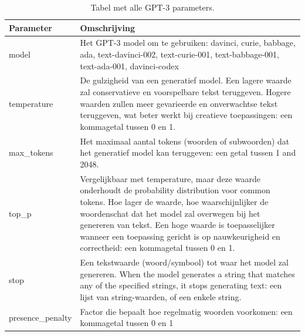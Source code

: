 \begin{center}
	\begin{table}[H]
	\begin{tabular}{ m{2cm} | m{13cm} | }
		\hline
		Parameter & Omschrijving \\
		\hline
		model & Het GPT-3 model om te gebruiken: davinci, curie, babbage, ada, text-davinci-002, text-curie-001, text-babbage-001, text-ada-001, davinci-codex \\
		\hline
		temperature & De gulzigheid van een generatief model. Een lagere waarde zal conservatieve en voorspelbare tekst teruggeven. Hogere waarden zullen meer gevarieerde en onverwachtse tekst teruggeven, wat beter werkt bij creatieve toepassingen: een kommagetal tussen 0 en 1. \\
		\hline
		max\_tokens & Het maximaal aantal tokens (woorden of subwoorden) dat het generatief model kan teruggeven: een getal tussen 1 and 2048. \\
		\hline
		top\_p & Vergelijkbaar met temperature, maar deze waarde onderhoudt de probability distribution voor common tokens. Hoe lager de waarde, hoe waarschijnlijker de woordenschat dat het model zal overwegen bij het genereren van tekst. Een hoge waarde is toepasselijker wanneer een toepassing gericht is op nauwkeurigheid en correctheid: een kommagetal tussen 0 en 1. \\
		\hline
		stop & Een tekstwaarde (woord/symbool) tot waar het model zal genereren. When the model generates a string that matches any of the specified strings, it stops generating text: een lijst van string-waarden, of een enkele string. \\
		\hline
		presence\_penalty & Factor die bepaalt hoe regelmatig woorden voorkomen: een kommagetal tussen 0 en 1 \\
		\hline
	\end{tabular}
		\caption{Tabel met alle GPT-3 parameters.}
		\label{table:gpt-3-parameters}
	\end{table}
\end{center}

\medspace

